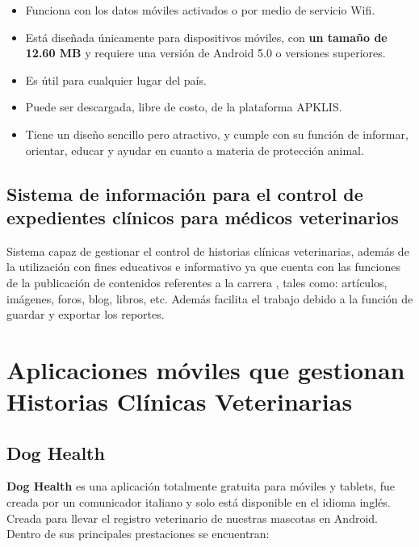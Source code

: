 \begin{itemize}
	\item Funciona con los datos móviles activados o por medio de servicio Wifi.
	\item Está diseñada únicamente para dispositivos móviles, con \textbf{un tamaño de 12.60 MB} y requiere una versión de Android 5.0 o versiones superiores.
	\item Es útil para cualquier lugar del país.
	\item Puede ser descargada, libre de costo, de la plataforma APKLIS.
	\item Tiene un diseño sencillo pero atractivo, y cumple con su función de informar, orientar, educar y ayudar en cuanto a materia de protección animal.
\end{itemize}

\subsection{Sistema de información para el control de expedientes clínicos para médicos veterinarios}

Sistema capaz de gestionar el control de historias clínicas veterinarias, además de la utilización con fines educativos e informativo ya que 
cuenta con las funciones de la publicación de contenidos referentes a la carrera , tales como: artículos, imágenes, foros, blog, libros, etc. Además facilita el trabajo debido a la función de guardar y exportar los reportes. 

\section{Aplicaciones móviles que gestionan Historias Clínicas Veterinarias}\label{chapter:appmov}

\subsection{Dog Health}\label{chapter:doghe}

%		


\textbf{Dog Health} es una aplicación totalmente gratuita para móviles y tablets, fue creada por un comunicador italiano y solo está disponible en el idioma inglés. Creada para llevar el registro veterinario de nuestras mascotas en Android. Dentro de sus principales prestaciones se encuentran:

